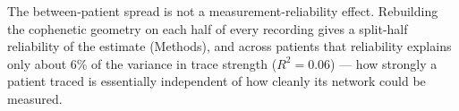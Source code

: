 The between-patient spread is not a measurement-reliability effect. Rebuilding the cophenetic geometry on each half of every recording gives a split-half reliability of the estimate (Methods), and across patients that reliability explains only about 6\% of the variance in trace strength (\(R^2 = 0.06\)) --- how strongly a patient traced is essentially independent of how cleanly its network could be measured.

